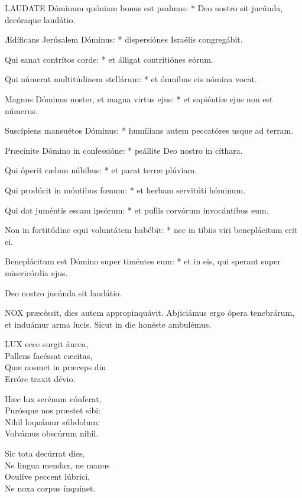 \lettrine[lines=2]{L}{AUDATE} Dóminum quóniam bonus est psalmus: * Deo nostro sit jucúnda, decóraque laudátio.

Ædíficans Jerúsalem Dóminus: * dispersiónes Israélis congregábit.

Qui sanat contrítos corde: * et álligat contritiónes eórum.

Qui númerat multitúdinem stellárum: * et ómnibus eis nómina vocat.

Magnus Dóminus noster, et magna virtus ejus: * et sapiéntiæ ejus non est númerus.

Suscípiens mansuétos Dóminus: * humílians autem peccatóres usque ad terram.

Præcínite Dómino in confessióne: * psállite Deo nostro in cíthara.

Qui óperit cælum núbibus: * et parat terræ plúviam.

Qui prodúcit in móntibus fœnum: * et herbam servitúti hóminum.

Qui dat juméntis escam ipsórum: * et pullis corvórum invocántibus eum.

Non in fortitúdine equi voluntátem habébit: * nec in tíbiis viri beneplácitum erit ei.

Beneplácitum est Dómino super timéntes eum: * et in eis, qui sperant super misericórdia ejus.

 Deo nostro jucúnda sit laudátio.



\lettrine[lines=2]{N}{OX} præcéssit, dies autem appropinquávit. Abjiciámus ergo ópera tenebrárum, et induámur arma lucis. Sicut in die honéste ambulémus.


\lettrine[lines=2]{L}{UX} ecce surgit áurea,\\
Pallens facéssat cæcitas,\\
Quæ nosmet in præceps diu\\
Erróre traxit dévio.

Hæc lux serénum cónferat,\\
Purósque nos præstet sibi:\\
Nihil loquámur súbdolum:\\
Volvámus obscúrum nihil.

Sic tota decúrrat dies,\\
Ne lingua mendax, ne manus\\
Oculíve peccent lúbrici,\\
Ne noxa corpus ínquinet.

